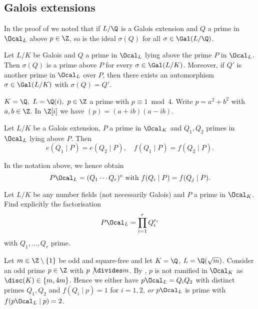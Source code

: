 \subsection*{Galois extensions}

In the proof of  we noted that if \( L/\Q \) is a Galois extension and \( Q \) a prime in \( \Ocal_L \) above \( p \in \Z \), so is the ideal \( \sigma(Q) \) for all \( \sigma \in \Gal(L/\Q) \).

\begin{thmn}\label{thm:2.20}
	Let \( L/K \) be Galois and \( Q \) a prime in \( \Ocal_L \) lying above the prime \( P \) in \( \Ocal_L \).
	Then \( \sigma(Q) \) is a prime above \( P \) for every \( \sigma \in \Gal(L/K) \).
	Moreover, if \( Q' \) is another prime in \( \Ocal_L \) over \( P \), then there exists an automorphism \( \sigma \in \Gal(L/K) \) with \( \sigma(Q) = Q' \).
\end{thmn}

\begin{exmp*}
	\( K = \Q,\ L = \Q(i),\ p \in \Z \) a prime with \( p \equiv 1 \bmod 4 \).
	Write \( p = a^2+b^2 \) with \( a,b \in \Z \).
	In \( \Z[i] \) we have \( (p) = (a+ib) (a-ib) \).
\end{exmp*}

\begin{cor}\label{thm:2.21}
	Let \( L/K \) be a Galois extension, \( P \) a prime in \( \Ocal_K \) and \( Q_1, Q_2 \) primes in \( \Ocal_L \) lying above \( P \).
	Then
	\[ e(Q_1 \mid P) = e(Q_2 \mid P),\quad f(Q_1 \mid P) = f(Q_2 \mid P). \]
\end{cor}

\begin{rem*}
	In the notation above, we hence obtain
	\[ P\Ocal_L = (Q_1 \dotsm Q_r)^e\ \text{with } f(Q_i \mid P) = f(Q_j \mid P). \]
\end{rem*}

\begin{frage*}
	Let \( L/K \) be any number fields (not necessarily Galois) and \( P \) a prime in \( \Ocal_K \).
	Find explicitly the factorisation
	\[ P\Ocal_L = \prod_{i=1}^{r} Q_i^{e_i} \]
	with \( Q_1, \dotsc, Q_r \) prime.
\end{frage*}

\begin{exmp*}
	Let \( m \in \Z\setminus\{1\} \) be odd and square-free and let \( K=\Q \), \( L = \Q(\sqrt{m}) \).
	Consider an odd prime \( p \in \Z \) with \( p \not\divides m \).
	By , \( p \) is not ramified in \( \Ocal_K \) as \( \disc(K) \in \{m, 4m\} \).
	Hence we either have \( p\Ocal_L = Q_i Q_2 \) with distinct primes \( Q_1, Q_2 \) and \( f(Q_i \mid p) = 1 \) for \( i=1, 2 \), \emph{or} \( p\Ocal_L \) is prime with \( f(p\Ocal_L \mid p) = 2 \).
\end{exmp*}

